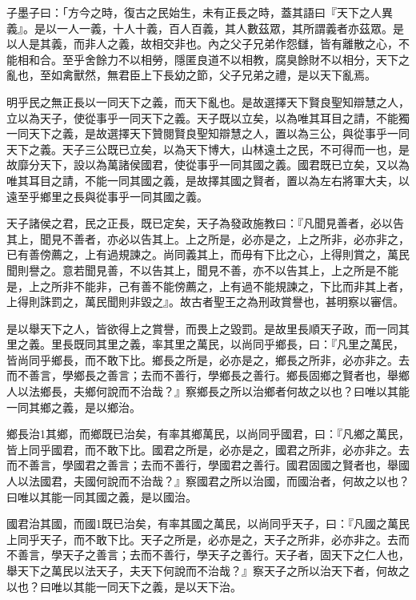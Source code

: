 
\begin{pinyinscope}
子墨子曰：「方今之時，復古之民始生，未有正長之時，蓋其語曰『天下之人異義』。是以一人一義，十人十義，百人百義，其人數茲眾，其所謂義者亦茲眾。是以人是其義，而非人之義，故相交非也。內之父子兄弟作怨讎，皆有離散之心，不能相和合。至乎舍餘力不以相勞，隱匿良道不以相教，腐臭餘財不以相分，天下之亂也，至如禽獸然，無君臣上下長幼之節，父子兄弟之禮，是以天下亂焉。

明乎民之無正長以一同天下之義，而天下亂也。是故選擇天下賢良聖知辯慧之人，立以為天子，使從事乎一同天下之義。天子既以立矣，以為唯其耳目之請，不能獨一同天下之義，是故選擇天下贊閱賢良聖知辯慧之人，置以為三公，與從事乎一同天下之義。天子三公既已立矣，以為天下博大，山林遠土之民，不可得而一也，是故靡分天下，設以為萬諸侯國君，使從事乎一同其國之義。國君既已立矣，又以為唯其耳目之請，不能一同其國之義，是故擇其國之賢者，置以為左右將軍大夫，以遠至乎鄉里之長與從事乎一同其國之義。

天子諸侯之君，民之正長，既已定矣，天子為發政施教曰：『凡聞見善者，必以告其上，聞見不善者，亦必以告其上。上之所是，必亦是之，上之所非，必亦非之，已有善傍薦之，上有過規諫之。尚同義其上，而毋有下比之心，上得則賞之，萬民聞則譽之。意若聞見善，不以告其上，聞見不善，亦不以告其上，上之所是不能是，上之所非不能非，己有善不能傍薦之，上有過不能規諫之，下比而非其上者，上得則誅罰之，萬民聞則非毀之』。故古者聖王之為刑政賞譽也，甚明察以審信。

是以舉天下之人，皆欲得上之賞譽，而畏上之毀罰。是故里長順天子政，而一同其里之義。里長既同其里之義，率其里之萬民，以尚同乎鄉長，曰：『凡里之萬民，皆尚同乎鄉長，而不敢下比。鄉長之所是，必亦是之，鄉長之所非，必亦非之。去而不善言，學鄉長之善言；去而不善行，學鄉長之善行。鄉長固鄉之賢者也，舉鄉人以法鄉長，夫鄉何說而不治哉？』察鄉長之所以治鄉者何故之以也？曰唯以其能一同其鄉之義，是以鄉治。

鄉長治1其鄉，而鄉既已治矣，有率其鄉萬民，以尚同乎國君，曰：『凡鄉之萬民，皆上同乎國君，而不敢下比。國君之所是，必亦是之，國君之所非，必亦非之。去而不善言，學國君之善言；去而不善行，學國君之善行。國君固國之賢者也，舉國人以法國君，夫國何說而不治哉？』察國君之所以治國，而國治者，何故之以也？曰唯以其能一同其國之義，是以國治。

國君治其國，而國1既已治矣，有率其國之萬民，以尚同乎天子，曰：『凡國之萬民上同乎天子，而不敢下比。天子之所是，必亦是之，天子之所非，必亦非之。去而不善言，學天子之善言；去而不善行，學天子之善行。天子者，固天下之仁人也，舉天下之萬民以法天子，夫天下何說而不治哉？』察天子之所以治天下者，何故之以也？曰唯以其能一同天下之義，是以天下治。


\end{pinyinscope}
